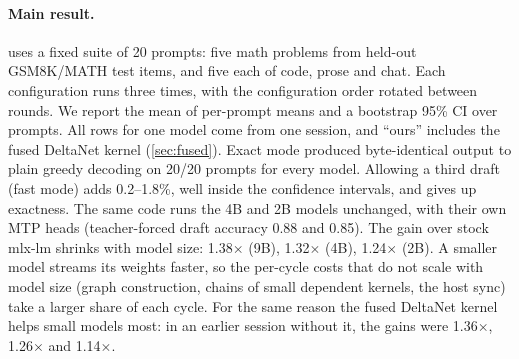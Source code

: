 \documentclass[11pt]{article}
\begin{document}
\paragraph{Main result.}  uses a fixed suite of 20 prompts: five math problems from held-out GSM8K/MATH test items, and five each of code, prose and chat. Each configuration runs three times, with the configuration order rotated between rounds. We report the mean of per-prompt means and a bootstrap 95\% CI over prompts. All rows for one model come from one session, and ``ours'' includes the fused DeltaNet kernel (\cref{sec:fused}). Exact mode produced byte-identical output to plain greedy decoding on 20/20 prompts for every model. Allowing a third draft (fast mode) adds 0.2--1.8\%, well inside the confidence intervals, and gives up exactness. The same code runs the 4B and 2B models unchanged, with their own MTP heads (teacher-forced draft accuracy 0.88 and 0.85). The gain over stock mlx-lm shrinks with model size: 1.38$\times$ (9B), 1.32$\times$ (4B), 1.24$\times$ (2B). A smaller model streams its weights faster, so the per-cycle costs that do not scale with model size (graph construction, chains of small dependent kernels, the host sync) take a larger share of each cycle. For the same reason the fused DeltaNet kernel helps small models most: in an earlier session without it, the gains were 1.36$\times$, 1.26$\times$ and 1.14$\times$.
\end{document}
